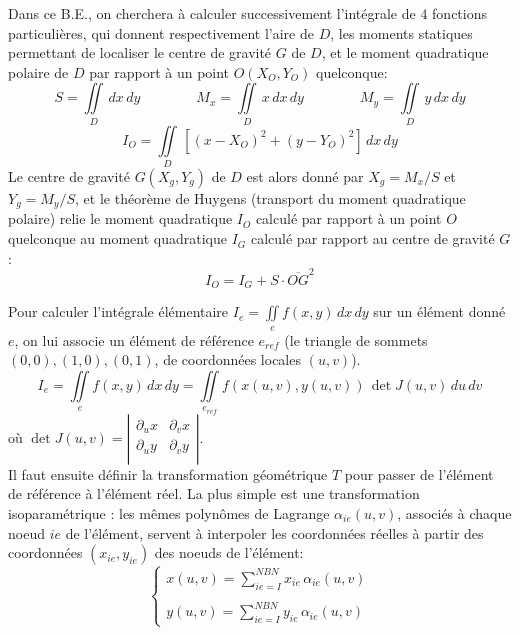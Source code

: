 \documentclass[a4paper, 10pt]{article}
\begin{document}
Dans ce B.E., on cherchera à calculer successivement l'intégrale de $4$ fonctions particulières,
qui donnent respectivement l'aire de $D$, les moments statiques permettant de localiser le
centre de gravité $G$ de $D$, et le moment quadratique polaire de $D$ par rapport à un point
$O(X_O, Y_O)$ quelconque:
\begin{equation}
S=\iint\limits_{D}\, dx\, dy \qquad\qquad
M_x=\iint\limits_{D}\, x\, dx\, dy \qquad\qquad
M_y=\iint\limits_{D}\, y\, dx\, dy
\end{equation}
\begin{equation}
I_O=\iint\limits_{D}\, \left[(x-X_O)^2+(y-Y_O)^2\right]\, dx\, dy
\end{equation}
Le centre de gravité $G(X_g, Y_g)$ de $D$ est alors donné par $X_g=M_x/S$ et $Y_g=M_y/S$, et le
théorème de Huygens (transport du moment quadratique polaire) relie le moment quadratique
$I_O$ calculé par rapport à un point $O$ quelconque au moment quadratique $I_G$ calculé par
rapport au centre de gravité $G$ :
\begin{equation}
I_O = I_G + S \cdot \overline{OG}^2
\label{huygens}
\end{equation}

Pour calculer l'intégrale élémentaire $I_e=\iint\limits_e f(x,y)\, dx\, dy$ sur un élément donné
$e$, on lui associe un élément de référence $e_{ref}$ (le triangle de sommets
$(0,0), (1,0), (0,1)$, de coordonnées locales $(u,v)$).
\begin{equation}
I_e=\iint\limits_e {f(x,y)\,dx\,dy} = \iint\limits_{e_{ref}} f(x(u,v), y(u,v))\, \det J(u,v)\, {du}\,  dv
\end{equation}
où
$
\det J(u,v)=
\left|
\begin{array}{rr} \partial_u x  & \partial_v x \\ \partial_u y  & \partial_v y \\ \end{array}
\right|  
$.\\

Il faut ensuite définir la transformation géométrique $T$ pour passer de l'élément de référence
à l'élément réel. La plus simple est une transformation isoparamétrique : les mêmes polynômes de
Lagrange $\alpha_{ie}(u,v)$, associés à chaque noeud $ie$ de l'élément, servent à interpoler les
coordonnées réelles à partir des coordonnées $(x_{ie}, y_{ie})$ des noeuds de l'élément:
\begin{equation}
\left\{ {\begin{array}{*{20}{c}}
 x(u,v)=\sum_{ie=I}^{NBN} x_{ie}\, \alpha_{ie}(u,v) \\ \\
y(u,v)=\sum_{ie=I}^{NBN} y_{ie}\, \alpha_{ie}(u,v)  
\end{array}} \right.
\label{isopara}
\end{equation}
\end{document}

